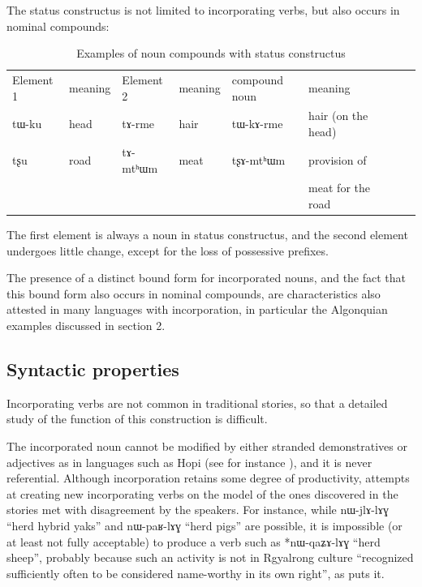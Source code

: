 \documentclass[oldfontcommands,oneside,a4paper,11pt]{article}
\newcommand{\ipa}[1]{{\phon #1}} %
\begin{document}
The \ipa{status constructus} is not limited to incorporating verbs, but also occurs in nominal compounds:


\begin{table}[H] \centering
\caption{Examples of noun compounds with status constructus}\label{tab:nom.comp}
\begin{tabular}{lllllllll} \toprule
Element 1 & meaning  & Element 2 & meaning & compound noun & meaning \\
  \ipa{tɯ-ku} & head & \ipa{tɤ-rme} & hair & \ipa{tɯ-kɤ-rme} & hair (on the head) \\
  \ipa{tʂu} & road & \ipa{tɤ-mtʰɯm} & meat & \ipa{tʂɤ-mtʰɯm} & provision of\\
  &&&&& meat for the road \\
 \bottomrule
\end{tabular}
\end{table}
 The first element is always a noun in \ipa{status constructus}, and the second element undergoes little change, except for  the loss of possessive prefixes.
   
   
The presence of a distinct bound form for incorporated nouns, and the fact that this bound form also occurs in nominal compounds, are characteristics also attested in many languages with incorporation, in particular the Algonquian examples discussed in section 2.
 
   
 
 
   
  \subsection{Syntactic properties}
Incorporating verbs are not common in traditional stories, so that a detailed study of the function of this construction is difficult. 

The incorporated noun cannot be modified by either stranded demonstratives or adjectives as in languages such as Hopi (see for instance \citealt[121]{haugen08incorp}), and it is never referential. Although incorporation retains some degree of productivity, attempts at creating new incorporating verbs on the model of the ones discovered in the stories met with disagreement by the speakers. For instance, while \ipa{nɯ-jlɤ-lɤɣ} ``herd hybrid yaks'' and \ipa{nɯ-paʁ-lɤɣ} ``herd pigs'' are possible, it is impossible (or at least not fully acceptable) to produce a verb such as *nɯ-qaʑɤ-lɤɣ ``herd sheep'', probably because such an activity is not in Rgyalrong culture ``recognized sufficiently often to be considered name-worthy in its own right'', as \citet[848]{mithun84incorp} puts it.
\end{document}
